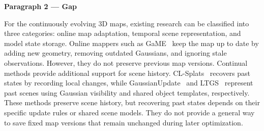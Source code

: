 

\textbf{Paragraph 2 — Gap}


For the continuously evolving 3D maps, existing research can be classified into three categories: online map adaptation, temporal scene representation, and model state storage.
Online mappers such as GaME~\cite{yugay2026game} keep the map up to date
by adding new geometry, removing outdated Gaussians, and ignoring stale
observations. However, they do not preserve previous map versions.
Continual methods provide additional support for scene history. 
CL-Splats~\cite{ackermann2025clsplats} recovers past states by recording
local changes, while GaussianUpdate~\cite{zeng2025gaussianupdate} and
LTGS~\cite{kim2026ltgs} represent past scenes using Gaussian visibility
and shared object templates, respectively.
These methods preserve scene history, but recovering past states depends
on their specific update rules or shared scene models.
They do not provide a general way to save fixed map versions that remain
unchanged during later optimization.


